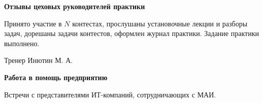 \begin{center}
\bfseries{\large Отзывы цеховых руководителей практики}
\end{center}

Принято участие в $N$ контестах, прослушаны установочные лекции и разборы задач, дорешаны задачи контестов, оформлен журнал практики. Задание практики выполнено.

\vspace{15pt}

\hfill Тренер Инютин М. А. 

\vspace{200pt}

\begin{center}
\bfseries{\large Работа в помощь предприятию}
\end{center}

Встречи с представителями ИТ-компаний, сотрудничающих с МАИ.

\pagebreak
